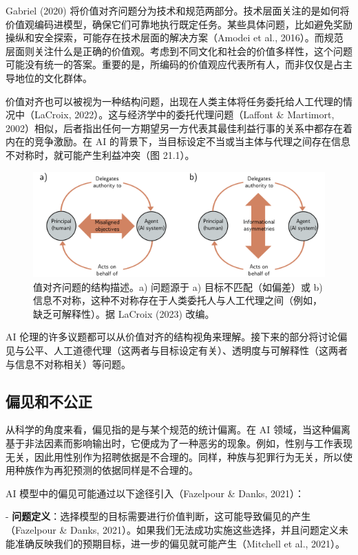 Gabriel (2020) 将价值对齐问题分为技术和规范两部分。技术层面关注的是如何将价值观编码进模型，确保它们可靠地执行既定任务。某些具体问题，比如避免奖励操纵和安全探索，可能存在技术层面的解决方案（Amodei et al., 2016）。而规范层面则关注什么是正确的价值观。考虑到不同文化和社会的价值多样性，这个问题可能没有统一的答案。重要的是，所编码的价值观应代表所有人，而非仅仅是占主导地位的文化群体。

价值对齐也可以被视为一种结构问题，出现在人类主体将任务委托给人工代理的情况中（LaCroix, 2022）。这与经济学中的委托代理问题（Laffont \& Martimort, 2002）相似，后者指出任何一方期望另一方代表其最佳利益行事的关系中都存在着内在的竞争激励。在 AI 的背景下，当目标设定不当或当主体与代理之间存在信息不对称时，就可能产生利益冲突（图 21.1）。

\begin{figure}[ht!]
\centering
\includegraphics[width=0.7\linewidth]{png/chapter21/EthicsStructural.png}
\caption{值对齐问题的结构描述。a) 问题源于 a) 目标不匹配（如偏差）或 b) 信息不对称，这种不对称存在于人类委托人与人工代理之间（例如，缺乏可解释性）。据 LaCroix (2023) 改编。}
\end{figure}
  

AI 伦理的许多议题都可以从价值对齐的结构视角来理解。接下来的部分将讨论偏见与公平、人工道德代理（这两者与目标设定有关）、透明度与可解释性（这两者与信息不对称相关）等问题。

\subsection{偏见和不公正}
从科学的角度来看，偏见指的是与某个规范的统计偏离。在 AI 领域，当这种偏离基于非法因素而影响输出时，它便成为了一种恶劣的现象。例如，性别与工作表现无关，因此用性别作为招聘依据是不合理的。同样，种族与犯罪行为无关，所以使用种族作为再犯预测的依据同样是不合理的。

AI 模型中的偏见可能通过以下途径引入（Fazelpour \& Danks, 2021）：

- \textbf{问题定义}：选择模型的目标需要进行价值判断，这可能导致偏见的产生（Fazelpour \& Danks, 2021）。如果我们无法成功实施这些选择，并且问题定义未能准确反映我们的预期目标，进一步的偏见就可能产生（Mitchell et al., 2021）。

